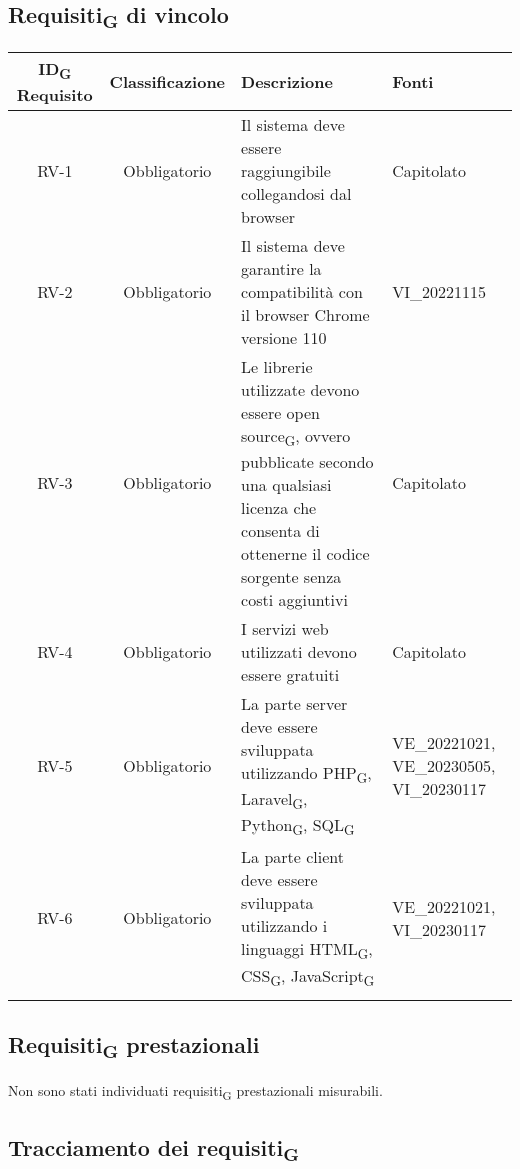 \subsection{Requisiti\textsubscript{G} di vincolo}
\setlength\extrarowheight{5pt}
\begin{tabularx}{\textwidth}{| c | c | X | X |} 
 \hline
 \rowcolor{white}
 \textbf{ID\textsubscript{G} Requisito} & \textbf{Classificazione} & \textbf{Descrizione} & \textbf{Fonti} \\
 \hline
 RV-1 & Obbligatorio &  Il sistema deve essere raggiungibile collegandosi dal browser & Capitolato\\
 \hline
  RV-2 & Obbligatorio & Il sistema deve garantire la compatibilità con il browser Chrome versione 110 & VI\_20221115\\
 \hline
 RV-3 & Obbligatorio &  Le librerie utilizzate devono essere open source\textsubscript{G}, ovvero pubblicate secondo una qualsiasi licenza che consenta di ottenerne il codice sorgente senza costi aggiuntivi & Capitolato\\
 \hline
 RV-4 & Obbligatorio & I servizi web utilizzati devono essere gratuiti &  Capitolato\\
 \hline
 RV-5 & Obbligatorio & La parte server deve essere sviluppata utilizzando PHP\textsubscript{G}, Laravel\textsubscript{G}, Python\textsubscript{G},  SQL\textsubscript{G} & 
 VE\_20221021, VE\_20230505, VI\_20230117\\
 \hline
 RV-6 & Obbligatorio & La parte client deve essere sviluppata utilizzando i linguaggi HTML\textsubscript{G}, CSS\textsubscript{G}, JavaScript\textsubscript{G} & VE\_20221021, VI\_20230117\\
 \hline
 \rowcolor{white}
 \caption{Requisiti\textsubscript{G} di vincolo}
\end{tabularx}

\subsection{Requisiti\textsubscript{G} prestazionali}
Non sono stati individuati requisiti\textsubscript{G} prestazionali misurabili.
\subsection{Tracciamento dei requisiti\textsubscript{G}}
